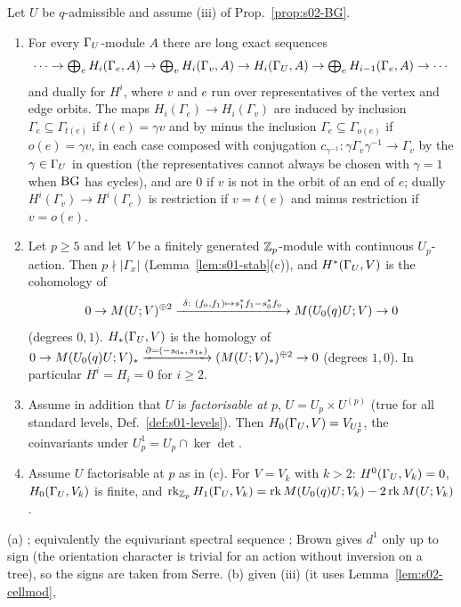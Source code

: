 \begin{proposition}\label{prop:s02-coh}
Let $U$ be $q$-admissible and assume (iii) of Prop.~\ref{prop:s02-BG}.
\begin{enumerate}[label=(\alph*)]
\item For every $\Gamma_U$-module $A$ there are long exact sequences
  \[\cdots\to\textstyle\bigoplus_{e}H_i(\Gamma_e,A)\to\bigoplus_{v}H_i(\Gamma_v,A)\to H_i(\Gamma_U,A)\to
  \bigoplus_eH_{i-1}(\Gamma_e,A)\to\cdots\]
  and dually for $H^i$, where $v$ and $e$ run over representatives of the vertex and edge orbits. The maps
  $H_i(\Gamma_e)\to H_i(\Gamma_v)$ are induced by inclusion $\Gamma_e\subseteq\Gamma_{t(e)}$ if $t(e)=\gamma v$ and by minus the inclusion $\Gamma_e\subseteq\Gamma_{o(e)}$ if $o(e)=\gamma v$, in each case composed with conjugation $c_{\gamma^{-1}}:\gamma\Gamma_v\gamma^{-1}\to\Gamma_v$ by the $\gamma\in\Gamma_U$ in question (the representatives cannot always be chosen with $\gamma=1$ when $\mathrm{BG}$ has cycles), and are $0$ if $v$ is not in the orbit of an end of $e$;
  dually $H^i(\Gamma_v)\to H^i(\Gamma_e)$ is restriction if $v=t(e)$ and minus restriction if $v=o(e)$.
\item Let $p\ge5$ and let $V$ be a finitely generated $\mathbb{Z}_p$-module with continuous $U_p$-action. Then
  $p\nmid|\Gamma_x|$ (Lemma~\ref{lem:s01-stab}(c)), and $H^*(\Gamma_U,V)$ is the cohomology of
  \[0\to\Brandt{U}{V}^{\oplus2}\xrightarrow{\ \delta:\ (f_0,f_1)\mapsto s_1^*f_1-s_0^*f_0\ }\Brandt{\Uzero{q}U}{V}\to0\]
  (degrees $0,1$). $H_*(\Gamma_U,V)$ is the homology of
  $0\to M(U_0(q)U;V)_*\xrightarrow{\partial=(-s_{0*},\,s_{1*})}(M(U;V)_*)^{\oplus2}\to0$ (degrees $1,0$).
  In particular $H^i=H_i=0$ for $i\ge2$.
\item Assume in addition that $U$ is \emph{factorisable at $p$}, $U=U_p\times U^{(p)}$ (true for all standard levels,
  Def.~\ref{def:s01-levels}). Then $H_0(\Gamma_U,V)=V_{U_p^1}$, the coinvariants under $U_p^1=U_p\cap\ker\det$.
\item Assume $U$ factorisable at $p$ as in (c). For $V=V_k$ with $k>2$: $H^0(\Gamma_U,V_k)=0$, $H_0(\Gamma_U,V_k)$ is finite, and
  $\operatorname{rk}_{\mathbb{Z}_p}H_1(\Gamma_U,V_k)=\operatorname{rk}M(U_0(q)U;V_k)-2\operatorname{rk}M(U;V_k)$.
\end{enumerate}
\end{proposition}
\noindent (a) \stcited{} ; equivalently the equivariant
spectral sequence ; Brown gives $d^1$ only up to sign (the orientation character is trivial for an action without inversion on a tree), so the signs are taken from Serre. (b) \stpmc{} given (iii) (it uses Lemma~\ref{lem:s02-cellmod},
